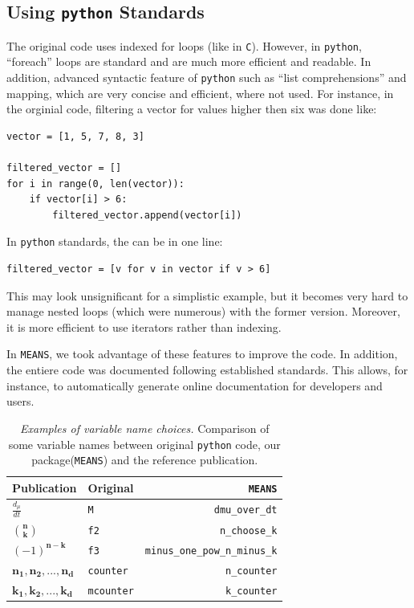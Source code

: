 \documentclass[11pt,a4paper]{article}
\newcommand{\means}{\texttt{MEANS}}
\newcommand{\py}{\texttt{python}}
\begin{document}
\subsection{Using \py{} Standards}
The original code uses indexed for loops (like in \texttt{C}).
However, in \py, ``foreach'' loops are  standard and are much more efficient and readable.
In addition, advanced syntactic feature of \py{} such as ``list comprehensions''  and mapping,
which are very concise and efficient, where not used.
For instance, in the orginial code, filtering a vector for values higher then six was done like:
\begin{verbatim}
vector = [1, 5, 7, 8, 3]

filtered_vector = []
for i in range(0, len(vector)):
    if vector[i] > 6:
        filtered_vector.append(vector[i])
\end{verbatim}
In \py{} standards, the can be in one line:
\begin{verbatim}
filtered_vector = [v for v in vector if v > 6]
\end{verbatim}

This may look unsignificant for a simplistic example, but it becomes very hard to manage nested loops (which were numerous) with the former version. 
Moreover, it is more efficient to use iterators rather than indexing.

In \means, we took advantage of these features to improve the code.
In addition, the entiere code was documented following established standards.
This allows, for instance, to automatically generate online documentation for developers and users.



\begin{table}[tbh]
\caption{\emph{Examples of variable name choices.}
Comparison of some  variable names between original \py{} code, our package(\means) and the reference publication.
}

\begin{center}   
	\begin{tabular}{ | l | l | r|}
	\hline
	\bf{Publication\cite{ale_general_2013}} & \bf{Original} & \bf{\means}\\
	\hline
	\hline
	$\frac{d_{\mu}}{dt}$ & \verb"M" & \verb"dmu_over_dt"\\
	\hline
	$\mathbf{n\choose{k}}$ & \verb"f2" & \verb"n_choose_k"\\
	\hline
	$ (-1)^\mathbf{{n-k}}$ & \verb"f3" & \verb"minus_one_pow_n_minus_k"\\
	\hline
	$\mathbf{n_1    , n_2, ..., n_d}$ & \verb"counter" & \verb"n_counter"\\
	\hline
	$\mathbf{k_1, k_2, ..., k_d}$ & \verb"mcounter" & \verb"k_counter"\\
	\hline
	\end{tabular}
\end{center}
\label{tab:varnames}
\end{table}
\end{document}
